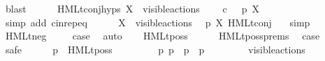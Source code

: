 \begin{isabellebody}
\ blast\isanewline
\ \ \ \ \isamarkupfalse%
\ HMLt{\isacharunderscore}{\kern0pt}conj{\isachardot}{\kern0pt}hyps\ {\isacartoucheopen}X\ {\isasymsubseteq}\ visible{\isacharunderscore}{\kern0pt}actions{\isacartoucheclose}\ \isamarkupfalse%
\ {\isacartoucheopen}{\isasymforall}{\isasymphi}{\isachardot}{\kern0pt}\ {\isasymphi}\ {\isasymin}\isactrlsub c\ {\isasymPhi}\ {\isasymlongrightarrow}\ p\ {\isasymTTurnstile}{\isacharbrackleft}{\kern0pt}X{\isacharbrackright}{\kern0pt}\ {\isasymphi}{\isacartoucheclose}\ \isamarkupfalse%
\ {\isacharparenleft}{\kern0pt}simp\ add{\isacharcolon}{\kern0pt}\ cin{\isachardot}{\kern0pt}rep{\isacharunderscore}{\kern0pt}eq{\isacharparenright}{\kern0pt}\isanewline
\ \ \ \ \isamarkupfalse%
\ {\isacartoucheopen}X\ {\isasymsubseteq}\ visible{\isacharunderscore}{\kern0pt}actions{\isacartoucheclose}\ \isamarkupfalse%
\ {\isacartoucheopen}p\ {\isasymTTurnstile}{\isacharbrackleft}{\kern0pt}X{\isacharbrackright}{\kern0pt}\ HMLt{\isacharunderscore}{\kern0pt}conj\ {\isasymPhi}{\isacartoucheclose}\ \isamarkupfalse%
\ simp\isanewline
\ \ \isamarkupfalse%
\isanewline
{}\isamarkupfalse%
\isanewline
\ \ \isamarkupfalse%
\ {\isacharparenleft}{\kern0pt}HMLt{\isacharunderscore}{\kern0pt}neg\ {\isasymphi}{\isacharparenright}{\kern0pt}\isanewline
\ \ \isamarkupfalse%
\ {\isacharquery}{\kern0pt}case\ \isamarkupfalse%
\ auto\isanewline
{}\isamarkupfalse%
\isanewline
\ \ \isamarkupfalse%
\ {\isacharparenleft}{\kern0pt}HMLt{\isacharunderscore}{\kern0pt}poss\ {\isasymalpha}\ {\isasymphi}{\isacharparenright}{\kern0pt}\isanewline
\ \ \isamarkupfalse%
\ HMLt{\isacharunderscore}{\kern0pt}poss{\isachardot}{\kern0pt}prems\ \isamarkupfalse%
\ {\isacharquery}{\kern0pt}case\isanewline
\ \ \isamarkupfalse%
\ safe\isanewline
\ \ \ \ \isamarkupfalse%
\ {\isacartoucheopen}p\ {\isasymTTurnstile}\ HMLt{\isacharunderscore}{\kern0pt}poss\ {\isasymalpha}\ {\isasymphi}{\isacartoucheclose}\isanewline
\ \ \ \ \isamarkupfalse%
\ {\isacartoucheopen}{\isasymexists}\ p{\isacharprime}{\kern0pt}{\isachardot}{\kern0pt}\ p\ {\isasymlongmapsto}{\isasymalpha}\ p{\isacharprime}{\kern0pt}\ {\isasymand}\ p{\isacharprime}{\kern0pt}\ {\isasymTTurnstile}\ {\isasymphi}{\isacartoucheclose}\ {\isacartoucheopen}{\isasymalpha}\ {\isacharequal}{\kern0pt}\ {\isasymtau}\ {\isasymor}\ {\isasymalpha}\ {\isasymin}\ visible{\isacharunderscore}{\kern0pt}actions{\isacartoucheclose}\ \isamarkupfalse%

\end{isabellebody}
